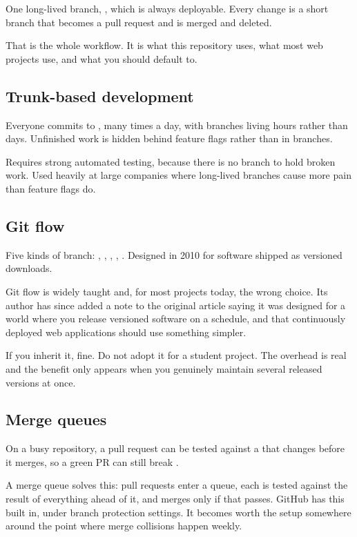 \documentclass[11pt]{article}
\begin{document}
One long-lived branch, , which is always deployable. Every change is a short
branch that becomes a pull request and is merged and deleted.

That is the whole workflow. It is what this repository uses, what most web projects
use, and what you should default to.

\subsection{Trunk-based development}

Everyone commits to , many times a day, with branches living hours rather
than days. Unfinished work is hidden behind feature flags rather than in branches.

Requires strong automated testing, because there is no branch to hold broken work.
Used heavily at large companies where long-lived branches cause more pain than
feature flags do.

\subsection{Git flow}

Five kinds of branch: , , , ,
. Designed in 2010 for software shipped as versioned downloads.

\begin{note}
Git flow is widely taught and, for most projects today, the wrong choice. Its author
has since added a note to the original article saying it was designed for a world
where you release versioned software on a schedule, and that continuously deployed
web applications should use something simpler.

If you inherit it, fine. Do not adopt it for a student project. The overhead is real
and the benefit only appears when you genuinely maintain several released versions
at once.
\end{note}

\subsection{Merge queues}

On a busy repository, a pull request can be tested against a  that changes
before it merges, so a green PR can still break .

A merge queue solves this: pull requests enter a queue, each is tested against the
result of everything ahead of it, and merges only if that passes. GitHub has this
built in, under branch protection settings. It becomes worth the setup somewhere
around the point where merge collisions happen weekly.
\end{document}
